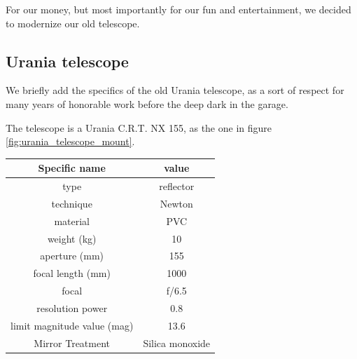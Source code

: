\documentclass{article}
\begin{document}
\begin{multicols}{2}
        For our money, but most importantly for our fun and entertainment, we decided to modernize our old telescope.

        \subsection{Urania telescope}
        We briefly add the specifics of the old Urania telescope, as a sort of respect for many years of honorable work before the deep dark in the garage.

        The telescope is a Urania C.R.T. NX 155, as the one in figure \ref{fig:urania_telescope_mount}.
        \\
        \begin{minipage}{0.5\textwidth}
            \centering
            \begin{tabular}{c|c}
                Specific name & value \\
                \hline
                type & reflector \\
                technique & Newton  \\
                material & PVC  \\
                weight (kg) & 10 \\
                aperture (mm) & 155 \\
                focal length (mm) & 1000 \\
                focal & f/6.5 \\
                resolution power & 0.8 \\
                limit magnitude value (mag) & 13.6 \\
                Mirror Treatment & Silica monoxide \\
                \hline
            \end{tabular}
        \end{minipage}


\end{multicols}
\end{document}
